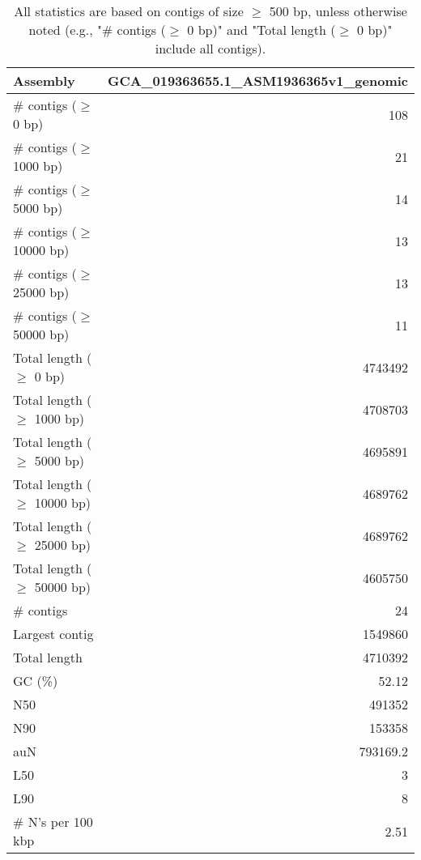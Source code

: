 \documentclass[12pt,a4paper]{article}
\begin{document}
\begin{table}[ht]
\begin{center}
\caption{All statistics are based on contigs of size $\geq$ 500 bp, unless otherwise noted (e.g., "\# contigs ($\geq$ 0 bp)" and "Total length ($\geq$ 0 bp)" include all contigs).}
\begin{tabular}{|l*{1}{|r}|}
\hline
Assembly & GCA\_019363655.1\_ASM1936365v1\_genomic \\ \hline
\# contigs ($\geq$ 0 bp) & 108 \\ \hline
\# contigs ($\geq$ 1000 bp) & 21 \\ \hline
\# contigs ($\geq$ 5000 bp) & 14 \\ \hline
\# contigs ($\geq$ 10000 bp) & 13 \\ \hline
\# contigs ($\geq$ 25000 bp) & 13 \\ \hline
\# contigs ($\geq$ 50000 bp) & 11 \\ \hline
Total length ($\geq$ 0 bp) & 4743492 \\ \hline
Total length ($\geq$ 1000 bp) & 4708703 \\ \hline
Total length ($\geq$ 5000 bp) & 4695891 \\ \hline
Total length ($\geq$ 10000 bp) & 4689762 \\ \hline
Total length ($\geq$ 25000 bp) & 4689762 \\ \hline
Total length ($\geq$ 50000 bp) & 4605750 \\ \hline
\# contigs & 24 \\ \hline
Largest contig & 1549860 \\ \hline
Total length & 4710392 \\ \hline
GC (\%) & 52.12 \\ \hline
N50 & 491352 \\ \hline
N90 & 153358 \\ \hline
auN & 793169.2 \\ \hline
L50 & 3 \\ \hline
L90 & 8 \\ \hline
\# N's per 100 kbp & 2.51 \\ \hline
\end{tabular}
\end{center}
\end{table}
\end{document}
